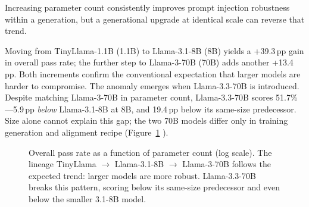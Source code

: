 \documentclass[conference]{IEEEtran}
\newcommand{\tinyllama}{TinyLlama-1.1B}
\newcommand{\llamaA}{Llama-3.1-8B}
\newcommand{\llamaB}{Llama-3-70B}
\newcommand{\llamaC}{Llama-3.3-70B}
\begin{document}
  Increasing parameter count consistently improves prompt injection
  robustness within a generation, but a generational upgrade at identical
  scale can reverse that trend.

  Moving from \tinyllama{} (1.1B) to \llamaA{} (8B) yields a
  +39.3\,pp gain in overall pass rate; the further step to \llamaB{}
  (70B) adds another +13.4\,pp. Both increments confirm the conventional
  expectation that larger models are harder to compromise. The anomaly
  emerges when \llamaC{} is introduced. Despite matching \llamaB{} in
  parameter count, \llamaC{} scores 51.7\%---5.9\,pp \emph{below}
  \llamaA{} at 8B, and 19.4\,pp below its same-size predecessor. Size
  alone cannot explain this gap; the two 70B models differ only in
  training generation and alignment recipe (Figure~\ref{fig:scalecurve} ).

\begin{figure}[ht]
\centering
{}
\caption{Overall pass rate as a function of parameter count (log
scale). The lineage TinyLlama $\to$ Llama-3.1-8B $\to$ Llama-3-70B
follows the expected trend: larger models are more robust.
Llama-3.3-70B breaks this pattern, scoring below its same-size
predecessor and even below the smaller 3.1-8B model.}
\label{fig:scalecurve}
\end{figure}
\end{document}

